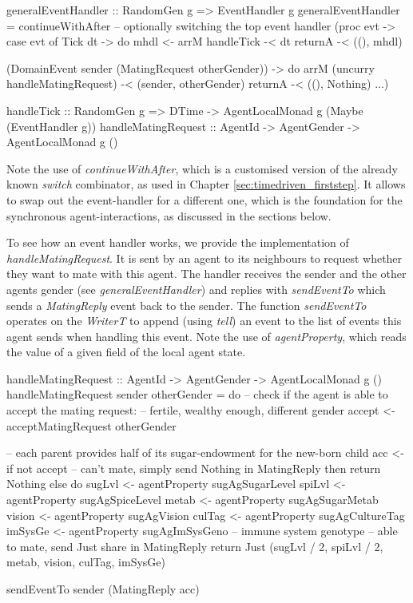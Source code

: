 \begin{HaskellCode}              
generalEventHandler :: RandomGen g => EventHandler g
generalEventHandler =
  continueWithAfter -- optionally switching the top event handler 
    (proc evt -> 
      case evt of 
        Tick dt -> do
          mhdl <- arrM handleTick -< dt
          returnA -< ((), mhdl)

        (DomainEvent sender (MatingRequest otherGender)) -> do
          arrM (uncurry handleMatingRequest) -< (sender, otherGender)
          returnA -< ((), Nothing)
        ...)
        
handleTick :: RandomGen g => DTime -> AgentLocalMonad g (Maybe (EventHandler g))
handleMatingRequest :: AgentId -> AgentGender -> AgentLocalMonad g ()
\end{HaskellCode}

Note the use of \textit{continueWithAfter}, which is a customised version of the already known \textit{switch} combinator, as used in Chapter \ref{sec:timedriven_firststep}. It allows to swap out the event-handler for a different one, which is the foundation for the synchronous agent-interactions, as discussed in the sections below.

To see how an event handler works, we provide the implementation of \textit{handleMatingRequest}. It is sent by an agent to its neighbours to request whether they want to mate with this agent. The handler receives the sender and the other agents gender (see \textit{generalEventHandler}) and replies with \textit{sendEventTo} which sends a \textit{MatingReply} event back to the sender. The function \textit{sendEventTo} operates on the \textit{WriterT} to append (using \textit{tell}) an event to the list of events this agent sends when handling this event. Note the use of \textit{agentProperty}, which reads the value of a given field of the local agent state. 

\begin{HaskellCode}
handleMatingRequest :: AgentId
                    -> AgentGender
                    -> AgentLocalMonad g ()
handleMatingRequest sender otherGender = do
  -- check if the agent is able to accept the mating request: 
  -- fertile, wealthy enough, different gender
  accept <- acceptMatingRequest otherGender

  -- each parent provides half of its sugar-endowment for the new-born child
  acc <- if not accept
      -- can't mate, simply send Nothing in MatingReply
      then return Nothing
      else do
        sugLvl  <- agentProperty sugAgSugarLevel
        spiLvl  <- agentProperty sugAgSpiceLevel
        metab   <- agentProperty sugAgSugarMetab
        vision  <- agentProperty sugAgVision
        culTag  <- agentProperty sugAgCultureTag
        imSysGe <- agentProperty sugAgImSysGeno -- immune system genotype
        -- able to mate, send Just share in MatingReply
        return Just (sugLvl / 2, spiLvl / 2, metab, vision, culTag, imSysGe)

  sendEventTo sender (MatingReply acc)
\end{HaskellCode}

